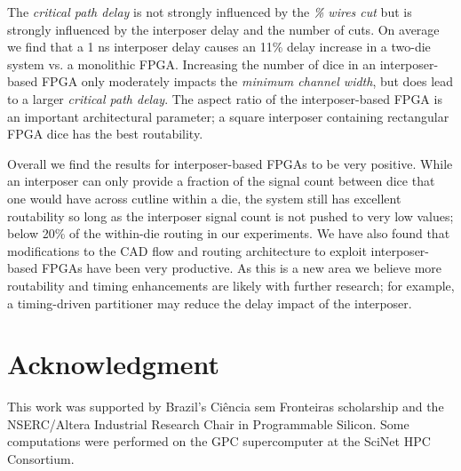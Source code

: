 \documentclass[journal]{IEEEtran}
\begin{document}
The \textit{critical path delay} is not strongly influenced by the \textit{\% wires cut} but is strongly influenced by the interposer delay and the number of cuts. On average we find that a 1 ns interposer delay causes an 11\% delay increase in a two-die system vs. a monolithic FPGA. Increasing the number of dice in an interposer-based FPGA only moderately impacts the \textit{minimum channel width}, but does lead to a larger \textit{critical path delay}. The aspect ratio of the interposer-based FPGA is an important architectural parameter; a square interposer containing rectangular FPGA dice has the best routability.

Overall we find the results for interposer-based FPGAs to be very positive. While an interposer can only provide a fraction of the signal count between dice that one would have across cutline within a die, the system still has excellent routability so long as the interposer signal count is not pushed to very low values; below 20\% of the within-die routing in our experiments. We have also found that modifications to the CAD flow and routing architecture to exploit interposer-based FPGAs have been very productive. As this is a new area we believe more routability and timing enhancements are likely with further research; for example, a timing-driven partitioner may reduce the delay impact of the interposer.

\section*{Acknowledgment}
This work was supported by Brazil's Ci\^{e}ncia sem Fronteiras scholarship and the NSERC/Altera Industrial Research Chair in Programmable Silicon. Some computations were performed on the GPC supercomputer at the SciNet HPC Consortium.




\end{document}
